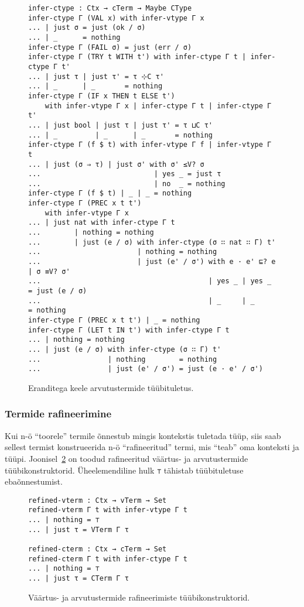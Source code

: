 \documentclass[a4paper,12pt]{article}
\begin{document}
\begin{figure}
  \begin{BVerbatim}
infer-ctype : Ctx → cTerm → Maybe CType
infer-ctype Γ (VAL x) with infer-vtype Γ x
... | just σ = just (ok / σ)
... | _      = nothing
infer-ctype Γ (FAIL σ) = just (err / σ)
infer-ctype Γ (TRY t WITH t') with infer-ctype Γ t | infer-ctype Γ t'
... | just τ | just τ' = τ ⊹C τ'
... | _      | _       = nothing
infer-ctype Γ (IF x THEN t ELSE t')
    with infer-vtype Γ x | infer-ctype Γ t | infer-ctype Γ t'
... | just bool | just τ | just τ' = τ ⊔C τ'
... | _         | _      | _       = nothing
infer-ctype Γ (f $ t) with infer-vtype Γ f | infer-vtype Γ t
... | just (σ ⇒ τ) | just σ' with σ' ≤V? σ
...                           | yes _ = just τ
...                           | no  _ = nothing
infer-ctype Γ (f $ t) | _ | _ = nothing
infer-ctype Γ (PREC x t t')
    with infer-vtype Γ x
... | just nat with infer-ctype Γ t
...        | nothing = nothing
...        | just (e / σ) with infer-ctype (σ ∷ nat ∷ Γ) t'
...                       | nothing = nothing
...                       | just (e' / σ') with e · e' ⊑? e | σ ≡V? σ'
...                                        | yes _ | yes _ = just (e / σ)
...                                        | _     | _     = nothing
infer-ctype Γ (PREC x t t') | _ = nothing
infer-ctype Γ (LET t IN t') with infer-ctype Γ t 
... | nothing = nothing
... | just (e / σ) with infer-ctype (σ ∷ Γ) t'
...                | nothing        = nothing
...                | just (e' / σ') = just (e · e' / σ')
  \end{BVerbatim}
  \caption{Eranditega keele arvutustermide tüübituletus.}
  \label{fig:exc.infer-ctype}
\end{figure}

\subsubsection{Termide rafineerimine}

Kui n-ö ``toorele'' termile õnnestub mingis kontekstis tuletada tüüp, siis saab sellest termist konstrueerida n-ö ``rafineeritud'' termi, mis ``teab'' oma konteksti ja tüüpi.
Joonisel~\ref{fig:exc.infer-term-type} on toodud rafineeritud väärtus- ja arvutustermide tüübikonstruktorid.
Üheelemendiline hulk {\tt ⊤} tähistab tüübituletuse ebaõnnestumist.
\begin{figure}
  \begin{BVerbatim}
refined-vterm : Ctx → vTerm → Set
refined-vterm Γ t with infer-vtype Γ t 
... | nothing = ⊤
... | just τ = VTerm Γ τ

refined-cterm : Ctx → cTerm → Set
refined-cterm Γ t with infer-ctype Γ t 
... | nothing = ⊤
... | just τ = CTerm Γ τ
  \end{BVerbatim}
  \caption{Väärtus- ja arvutustermide rafineerimiste tüübikonstruktorid.}
  \label{fig:exc.infer-term-type}
\end{figure}
\end{document}
